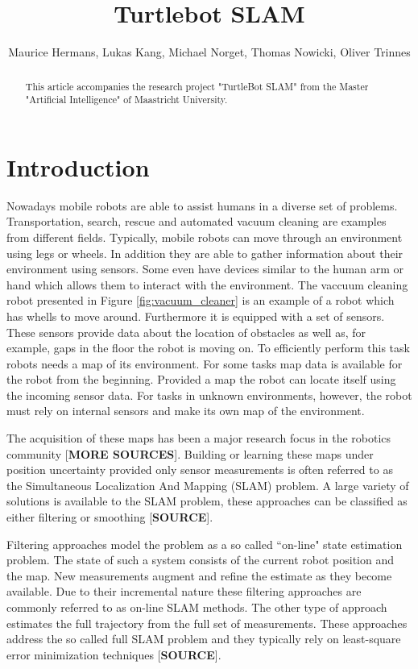 \documentclass{ba-kecs}
\title{Turtlebot SLAM }
\author{Maurice Hermans, Lukas Kang, Michael Norget, Thomas Nowicki, Oliver Trinnes}
\begin{document}
\maketitle

\begin{abstract}
This article accompanies the research project "TurtleBot SLAM" from the Master "Artificial Intelligence" of Maastricht University.
\end{abstract}

\section{Introduction}
Nowadays mobile robots are able to assist humans in a diverse set of problems. Transportation, search, rescue and automated vacuum cleaning are examples from different fields. Typically, mobile robots can move through an environment using legs or wheels. In addition they are able to gather information about their environment using sensors. Some even have devices similar to the human arm or hand which allows them to interact with the environment. The vaccuum cleaning robot presented in Figure \ref{fig:vacuum_cleaner} is an example of a robot which has whells to move around. Furthermore it is equipped with a set of sensors. These sensors provide data about the location of obstacles as well as, for example, gaps in the floor the robot is moving on. To efficiently perform this task robots needs a map of its environment. For some tasks map data is available for the robot from the beginning. Provided a map the robot can locate itself using the incoming sensor data. For tasks in unknown environments, however, the robot must rely on internal sensors and make its own map of the environment.

The acquisition of these maps has been a major research focus in the robotics community \cite{Grisetti} [\textbf{MORE SOURCES}]. Building or learning these maps under position uncertainty provided only sensor measurements is often referred to as the Simultaneous Localization And Mapping (SLAM) problem. A large variety of solutions is available to the SLAM problem, these approaches can be classified as either filtering or smoothing [\textbf{SOURCE}].

Filtering approaches model the problem as a so called ``on-line" state estimation problem. The state of such a system consists of the current robot position and the map. New measurements augment and refine the estimate as they become available. Due to their incremental nature these filtering approaches are commonly referred to as on-line SLAM methods. The other type of approach estimates the full trajectory from the full set of measurements. These approaches address the so called full SLAM problem and they typically rely on least-square error minimization techniques [\textbf{SOURCE}].
\end{document}
